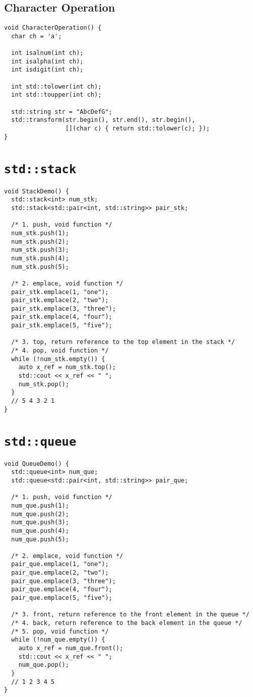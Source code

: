 \subsection{Character Operation}
\begin{lstlisting}
void CharacterOperation() {
  char ch = 'a';

  int isalnum(int ch);
  int isalpha(int ch);
  int isdigit(int ch);

  int std::tolower(int ch);
  int std::toupper(int ch);

  std::string str = "AbcDefG";
  std::transform(str.begin(), str.end(), str.begin(),
                 [](char c) { return std::tolower(c); });
}
\end{lstlisting}

\section{{\colorbox{CodeBackground}{\lstinline|std::stack|}}}
\begin{lstlisting}
void StackDemo() {
  std::stack<int> num_stk;
  std::stack<std::pair<int, std::string>> pair_stk;

  /* 1. push, void function */
  num_stk.push(1);
  num_stk.push(2);
  num_stk.push(3);
  num_stk.push(4);
  num_stk.push(5);

  /* 2. emplace, void function */
  pair_stk.emplace(1, "one");
  pair_stk.emplace(2, "two");
  pair_stk.emplace(3, "three");
  pair_stk.emplace(4, "four");
  pair_stk.emplace(5, "five");

  /* 3. top, return reference to the top element in the stack */
  /* 4. pop, void function */
  while (!num_stk.empty()) {
    auto x_ref = num_stk.top();
    std::cout << x_ref << " ";
    num_stk.pop();
  }
  // 5 4 3 2 1
}
\end{lstlisting}

\section{{\colorbox{CodeBackground}{\lstinline|std::queue|}}}
\begin{lstlisting}
void QueueDemo() {
  std::queue<int> num_que;
  std::queue<std::pair<int, std::string>> pair_que;

  /* 1. push, void function */
  num_que.push(1);
  num_que.push(2);
  num_que.push(3);
  num_que.push(4);
  num_que.push(5);

  /* 2. emplace, void function */
  pair_que.emplace(1, "one");
  pair_que.emplace(2, "two");
  pair_que.emplace(3, "three");
  pair_que.emplace(4, "four");
  pair_que.emplace(5, "five");

  /* 3. front, return reference to the front element in the queue */
  /* 4. back, return reference to the back element in the queue */
  /* 5. pop, void function */
  while (!num_que.empty()) {
    auto x_ref = num_que.front();
    std::cout << x_ref << " ";
    num_que.pop();
  }
  // 1 2 3 4 5
}
\end{lstlisting}

